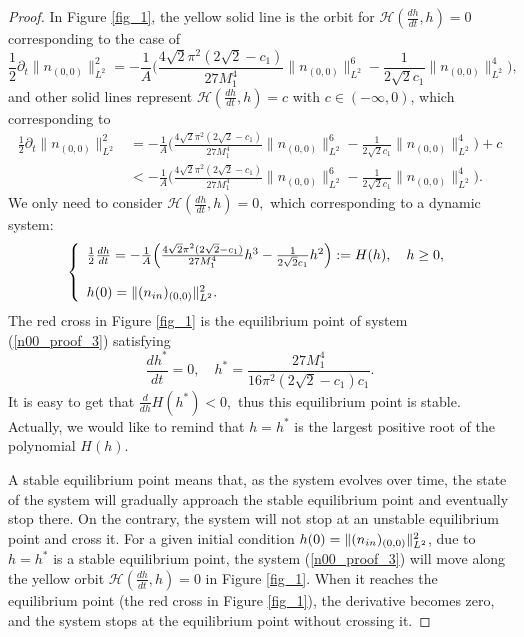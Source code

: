 \documentclass[12pt, reqno]{amsart}
\numberwithin{equation}{section}
\begin{document}
\begin{proof}
		In Figure \ref{fig_1}, the yellow solid line is the orbit for $\mathcal{H}(\frac{dh}{dt},h)=0$ corresponding to the case of  
		$$\frac{1}{2}\partial_t\|n_{(0,0)}\|^2_{L^2}= 
		-\frac{1}{A}\Big(\frac{4\sqrt{2}\pi^2(2\sqrt{2}-c_1)}{27M_1^4}\|n_{(0,0)}\|_{L^2}^6-\frac{1}{2\sqrt{2}c_1}\|n_{(0,0)}\|^4_{L^2}\Big),$$
		and other solid lines represent  $\mathcal{H}(\frac{dh}{dt},h)=c$ with
		$c\in(-\infty,0)$, which corresponding to
		\begin{align*}
			\frac{1}{2}\partial_t\|n_{(0,0)}\|^2_{L^2}&= 
			-\frac{1}{A}\Big(\frac{4\sqrt{2}\pi^2(2\sqrt{2}-c_1)}{27M_1^4}\|n_{(0,0)}\|_{L^2}^6-\frac{1}{2\sqrt{2}c_1}\|n_{(0,0)}\|^4_{L^2}\Big)+c\\
			&<	-\frac{1}{A}\Big(\frac{4\sqrt{2}\pi^2(2\sqrt{2}-c_1)}{27M_1^4}\|n_{(0,0)}\|_{L^2}^6-\frac{1}{2\sqrt{2}c_1}\|n_{(0,0)}\|^4_{L^2}\Big).
		\end{align*}
		We only need to consider
		$\mathcal{H}(\frac{dh}{dt},h)=0,$ which corresponding to a dynamic system:
		\begin{equation}\label{n00_proof_3}
			\left\{
			\begin{array}{lr}
				\frac{1}{2}\frac{dh}{dt}=
				-\frac{1}{A}\Big(\frac{4\sqrt{2}\pi^2(2\sqrt{2}-c_1)}{27M_1^4}h^3-\frac{1}{2\sqrt{2}c_1}h^2\Big):=H(h), \quad h\geq0,\\
				\\
				h(0)=\|(n_{\rm in})_{(0,0)}\|^2_{L^2}.
			\end{array}
			\right.
		\end{equation}
		The red cross in Figure \ref{fig_1} is the equilibrium point of system (\ref{n00_proof_3}) satisfying
		$$\frac{dh^*}{dt}=0,\quad h^*=\frac{27M_1^4}{16\pi^2(2\sqrt{2}-c_1)c_1}.$$
		It is easy to get that $\frac{d}{dh}H(h^*)<0,$ thus this equilibrium point is stable.
		Actually, we would like to remind that $h=h^*$ is the largest positive root of the polynomial $H(h).$
		
		A stable equilibrium point means that, as the system evolves over time, the state of the system will gradually approach the stable equilibrium point and eventually stop there.
		On the contrary, the system will not stop at an unstable equilibrium point and cross it.
		For a given initial condition $h(0)=\|(n_{\rm in})_{(0,0)}\|^2_{L^2}$, due to $h=h^*$ is a stable equilibrium point, the system (\ref{n00_proof_3}) will move along the yellow orbit $\mathcal{H}(\frac{dh}{dt},h)=0$ in Figure \ref{fig_1}. When it reaches the equilibrium point (the red cross in Figure \ref{fig_1}), the derivative becomes zero, and the system stops at the equilibrium point without crossing it.
		

\end{proof}
\end{document}
